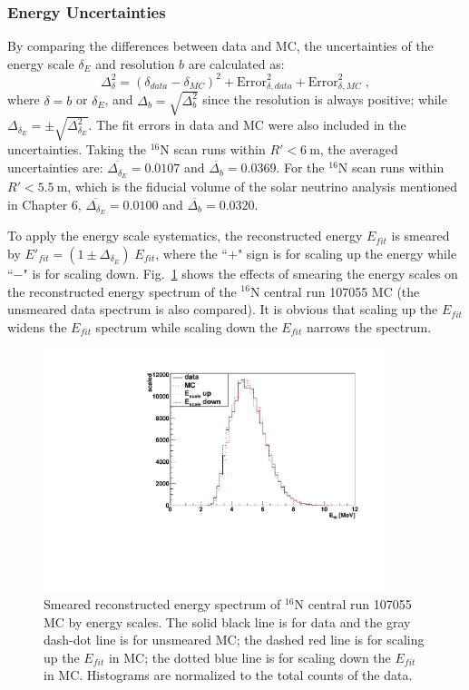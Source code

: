 \subsubsection{Energy Uncertainties}\label{sect:eneryUncertianties}

By comparing the differences between data and MC, the uncertainties of the energy scale $\delta_E$ and resolution $b$ are calculated as:
\begin{equation}
\Delta^2_{\delta}= (\delta_{data}-\delta_{MC})^2+\mathrm{Error}^2_{\delta,data}+\mathrm{Error}^2_{\delta,MC}\; ,
\end{equation}
where $\delta=b$ or $\delta_E$, and $\Delta_b=\sqrt{\Delta^2_{b}}$ since the resolution is always positive; while $\Delta_{\delta_E}=\pm\sqrt{\Delta^2_{\delta_E}}$. The fit errors in data and MC were also included in the uncertainties. Taking the $^{16}$N scan runs within $R'<6~$m, the averaged uncertainties are: $\overline{\Delta_{\delta_E}}=0.0107$ and $\overline{\Delta_{b}}=0.0369$. For the $^{16}$N scan runs within $R'<5.5~\mathrm{m}$, which is the fiducial volume of the solar neutrino analysis mentioned in Chapter 6, $\overline{\Delta_{\delta_E}}=0.0100$ and $\overline{\Delta_{b}}=0.0320$.

To apply the energy scale systematics, the reconstructed energy $E_{fit}$ is smeared by $E'_{fit}=(1\pm\Delta_{\delta_E}) \; E_{fit}$, where the ``$+$" sign is for scaling up the energy while ``$-$" is for scaling down. Fig.~\ref{fig:EscaleSmear} shows the effects of smearing the energy scales on the reconstructed energy spectrum of the $^{16}$N central run 107055 MC (the unsmeared data spectrum is also compared). It is obvious that scaling up the $E_{fit}$ widens the $E_{fit}$ spectrum while scaling down the $E_{fit}$ narrows the spectrum. 

\begin{figure}
	\centering
	\includegraphics[width=10cm]{SmearedEscale_N16.pdf}
	\caption[Smeared reconstructed energy spectrum of $^{16}$N central run 107055 MC by energy scales.]{Smeared reconstructed energy spectrum of $^{16}$N central run 107055 MC by energy scales. The solid black line is for data and the gray dash-dot line is for unsmeared MC; the dashed red line is for scaling up the $E_{fit}$ in MC; the dotted blue line is for scaling down the $E_{fit}$ in MC. Histograms are normalized to the total counts of the data.\label{fig:EscaleSmear}}
\end{figure}

